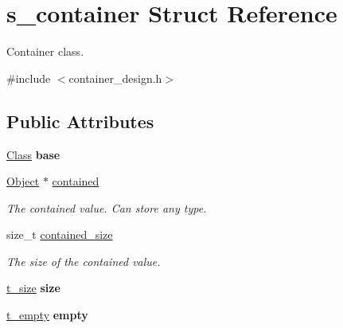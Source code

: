\hypertarget{structs__container}{}\section{s\+\_\+container Struct Reference}
\label{structs__container}


Container class.  




{\ttfamily \#include $<$container\+\_\+design.\+h$>$}

\subsection*{Public Attributes}
\begin{DoxyCompactItemize}
\item 
\hyperlink{structClass}{Class} {\bfseries base}\hypertarget{structs__container_a254ca7d3c9248174449b00c1c7887e5e}{}\label{structs__container_a254ca7d3c9248174449b00c1c7887e5e}

\item 
\hyperlink{object_8h_a608d016c3acb8a52cdfb8e21a8fd294e}{Object} $\ast$ \hyperlink{structs__container_a46a37b6427c9569f29422c515529a48b}{contained}\hypertarget{structs__container_a46a37b6427c9569f29422c515529a48b}{}\label{structs__container_a46a37b6427c9569f29422c515529a48b}

\begin{DoxyCompactList}\small\item\em The contained value. Can store any type. \end{DoxyCompactList}\item 
size\+\_\+t \hyperlink{structs__container_a27e071d7cdc230a146fe99ddd4fa8c4a}{contained\+\_\+size}
\begin{DoxyCompactList}\small\item\em The size of the contained value. \end{DoxyCompactList}\item 
\hyperlink{container__design_8h_ae774d8ee9fffa85665bc2fc11b3ec3c5}{t\+\_\+size} {\bfseries size}\hypertarget{structs__container_a4a2d04ccb972e977d73d0368fba9c5f8}{}\label{structs__container_a4a2d04ccb972e977d73d0368fba9c5f8}

\item 
\hyperlink{container__design_8h_a6ec332e60166105a8d4407e11b50f1dd}{t\+\_\+empty} {\bfseries empty}\hypertarget{structs__container_a012341a28cc9b020c10b217824df293c}{}\label{structs__container_a012341a28cc9b020c10b217824df293c}


\end{DoxyCompactItemize}
